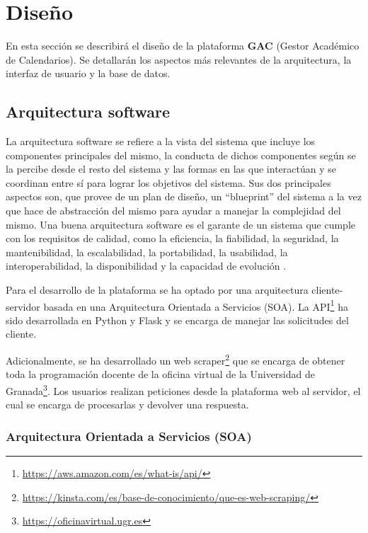 \chapter{Diseño}
En esta sección se describirá el diseño de la plataforma \textbf{GAC} (Gestor Académico de Calendarios). Se detallarán los aspectos más relevantes de la arquitectura, la interfaz de usuario y la base de datos.

\newpage

\section{Arquitectura software}
La arquitectura software se refiere a la vista del sistema que incluye los componentes principales del mismo, la conducta de dichos componentes según se la percibe desde el resto del sistema y las formas en las que interactúan y se coordinan entre sí para lograr los objetivos del sistema. Sus dos principales aspectos son, que provee de un plan de diseño, un ``blueprint'' del sistema a la vez que hace de abstracción del mismo para ayudar a manejar la complejidad del mismo. Una buena arquitectura software es el garante de un sistema que cumple con los requisitos de calidad, como la eficiencia, la fiabilidad, la seguridad, la mantenibilidad, la escalabilidad, la portabilidad, la usabilidad, la interoperabilidad, la disponibilidad y la capacidad de evolución \cite{hofmeister2000applied, reynoso2004introduccion, garlan2008software}.\newline

Para el desarrollo de la plataforma se ha optado por una arquitectura cliente-servidor basada en una Arquitectura Orientada a Servicios (SOA). La API\footnote{\url{https://aws.amazon.com/es/what-is/api/}} ha sido desarrollada en Python y Flask y se encarga de manejar las solicitudes del cliente.\newline

Adicionalmente, se ha desarrollado un web scraper\footnote{\url{https://kinsta.com/es/base-de-conocimiento/que-es-web-scraping/}} que se encarga de obtener toda la programación docente de la oficina virtual de la Universidad de Granada\footnote{\url{https://oficinavirtual.ugr.es}}. Los usuarios realizan peticiones desde la plataforma web al servidor, el cual se encarga de procesarlas y devolver una respuesta.\newline

\subsection{Arquitectura Orientada a Servicios (SOA)}

